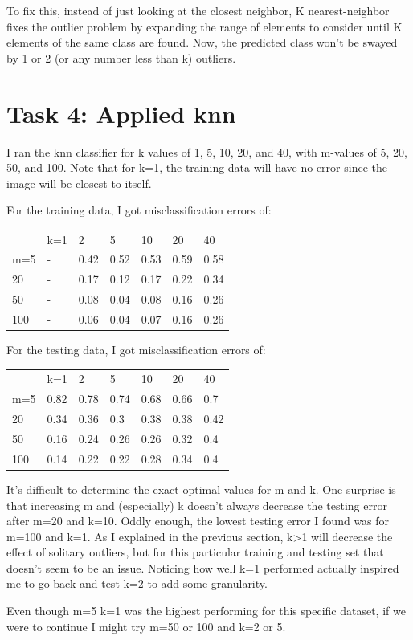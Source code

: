\documentclass{article}
\begin{document}
To fix this, instead of just looking at the closest neighbor, K nearest-neighbor fixes the outlier problem by expanding the range of elements to consider until K elements of the same class are found. Now, the predicted class won't be swayed by 1 or 2 (or any number less than k) outliers.

\section{Task 4: Applied knn}

I ran the knn classifier for k values of 1, 5, 10, 20, and 40, with m-values of 5, 20, 50, and 100. Note that for k=1, the training data will have no error since the image will be closest to itself. 

\medskip \noindent
For the training data, I got misclassification errors of:

{
\centering
\begin{tabular}{lllllll}
    & k=1 & 2    & 5    & 10   & 20   & 40   \\
m=5 & -   & 0.42 & 0.52 & 0.53 & 0.59 & 0.58 \\
20  & -   & 0.17 & 0.12 & 0.17 & 0.22 & 0.34 \\
50  & -   & 0.08 & 0.04 & 0.08 & 0.16 & 0.26 \\
100 & -   & 0.06 & 0.04 & 0.07 & 0.16 & 0.26
\end{tabular}
}

\medskip \noindent
For the testing data, I got misclassification errors of:


{
\centering
\begin{tabular}{lllllll}

    & k=1  & 2    & 5    & 10   & 20   & 40   \\
m=5 & 0.82 & 0.78 & 0.74 & 0.68 & 0.66 & 0.7  \\
20  & 0.34 & 0.36 & 0.3  & 0.38 & 0.38 & 0.42 \\
50  & 0.16 & 0.24 & 0.26 & 0.26 & 0.32 & 0.4  \\
100 & 0.14 & 0.22 & 0.22 & 0.28 & 0.34 & 0.4 
\end{tabular}
}

\medskip\noindent
It's difficult to determine the exact optimal values for m and k. One surprise is that increasing m and (especially) k doesn't always decrease the testing error after m=20 and k=10. Oddly enough, the lowest testing error I found was for m=100 and k=1. As I explained in the previous section, k>1 will decrease the effect of solitary outliers, but for this particular training and testing set that doesn't seem to be an issue. Noticing how well k=1 performed actually inspired me to go back and test k=2 to add some granularity.

Even though m=5 k=1 was the highest performing for this specific dataset, if we were to continue I might try m=50 or 100 and k=2 or 5.
\end{document}
